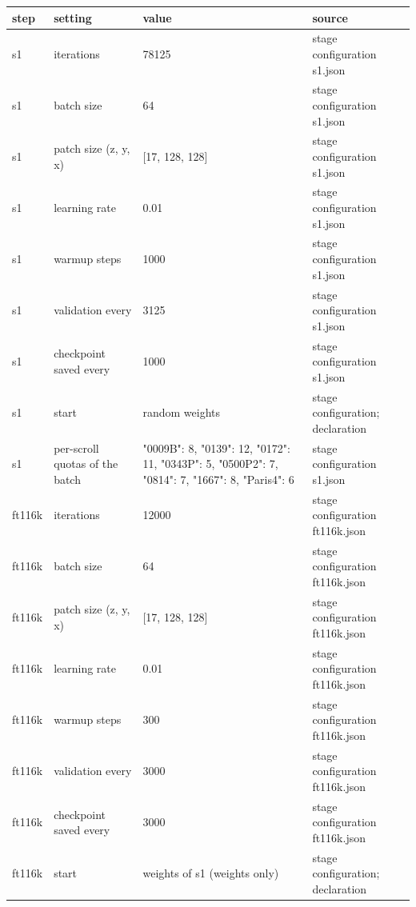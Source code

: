 \clearpage\onecolumn
{\small\setlength{\tabcolsep}{3pt}
\begin{longtable}{@{}p{2.2cm}p{4.6cm}p{5.2cm}p{4.4cm}@{}}
step & setting & value & source \\ \hline \endhead
s1 & iterations & 78125 & stage configuration s1.\allowbreak{}json \\
s1 & batch size & 64 & stage configuration s1.\allowbreak{}json \\
s1 & patch size (z,\allowbreak{} y,\allowbreak{} x) & [17, 128, 128] & stage configuration s1.\allowbreak{}json \\
s1 & learning rate & 0.01 & stage configuration s1.\allowbreak{}json \\
s1 & warmup steps & 1000 & stage configuration s1.\allowbreak{}json \\
s1 & validation every & 3125 & stage configuration s1.\allowbreak{}json \\
s1 & checkpoint saved every & 1000 & stage configuration s1.\allowbreak{}json \\
s1 & start & random weights & stage configuration; declaration \\
s1 & per-scroll quotas of the batch & {"0009B":\allowbreak{} 8,\allowbreak{} "0139":\allowbreak{} 12,\allowbreak{} "0172":\allowbreak{} 11,\allowbreak{} "0343P":\allowbreak{} 5,\allowbreak{} "0500P2":\allowbreak{} 7,\allowbreak{} "0814":\allowbreak{} 7,\allowbreak{} "1667":\allowbreak{} 8,\allowbreak{} "Paris4":\allowbreak{} 6} & stage configuration s1.\allowbreak{}json \\
ft116k & iterations & 12000 & stage configuration ft116k.\allowbreak{}json \\
ft116k & batch size & 64 & stage configuration ft116k.\allowbreak{}json \\
ft116k & patch size (z,\allowbreak{} y,\allowbreak{} x) & [17, 128, 128] & stage configuration ft116k.\allowbreak{}json \\
ft116k & learning rate & 0.01 & stage configuration ft116k.\allowbreak{}json \\
ft116k & warmup steps & 300 & stage configuration ft116k.\allowbreak{}json \\
ft116k & validation every & 3000 & stage configuration ft116k.\allowbreak{}json \\
ft116k & checkpoint saved every & 3000 & stage configuration ft116k.\allowbreak{}json \\
ft116k & start & weights of s1 (weights only) & stage configuration; declaration \\

\end{longtable}}
